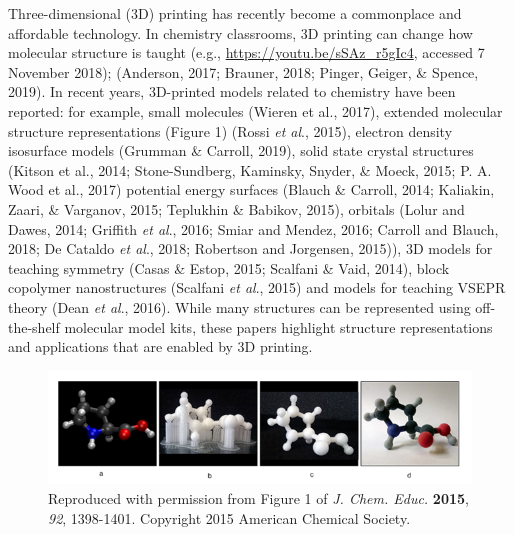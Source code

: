 \documentclass[11.5pt]{sig-alternate} %
\begin{document}
\begin{large}
Three-dimensional (3D) printing has recently become a commonplace and affordable technology. In chemistry classrooms, 3D printing can change how molecular structure is taught (e.g., \url{https://youtu.be/sSAz\_r5gIc4}, accessed 7 November 2018); (Anderson, 2017; Brauner, 2018; Pinger, Geiger, \& Spence, 2019). In recent years, 3D-printed models related to chemistry have been reported: for example, small molecules (Wieren et al., 2017), extended molecular structure representations (Figure 1) (Rossi \textit{et al}., 2015), electron density isosurface models (Grumman \& Carroll, 2019),  solid state crystal structures (Kitson et al., 2014; Stone-Sundberg, Kaminsky, Snyder, \& Moeck, 2015; P. A. Wood et al., 2017) potential energy surfaces (Blauch \& Carroll, 2014; Kaliakin, Zaari, \& Varganov, 2015; Teplukhin \& Babikov, 2015), orbitals (Lolur and Dawes, 2014; Griffith \textit{et al}., 2016; Smiar and Mendez, 2016; Carroll and Blauch, 2018; De Cataldo \textit{et al}., 2018; Robertson and Jorgensen, 2015)), 3D models for teaching symmetry (Casas \& Estop, 2015; Scalfani \& Vaid, 2014), block copolymer nanostructures (Scalfani \textit{et al}., 2015) and models for teaching VSEPR theory (Dean \textit{et al}., 2016). While many structures can be represented using off-the-shelf molecular model kits, these papers highlight structure representations and applications that are enabled by 3D printing.

\begin{figure}[h]
    \centering
    \includegraphics[width=1\linewidth]{fig1.png}
    \caption{Reproduced with permission from Figure 1 of \textit{J. Chem. Educ.} \textbf{2015}, \textit{92}, 1398-1401. Copyright 2015 American Chemical Society.}
\end{figure}


\end{large}
\end{document}
